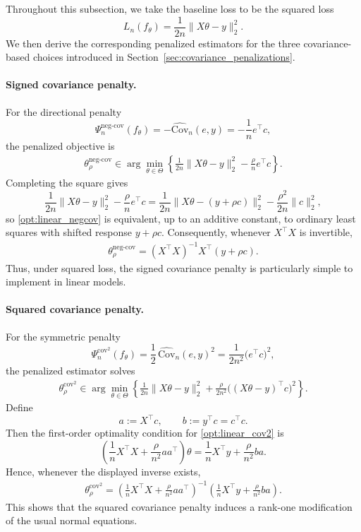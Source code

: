 \documentclass[12pt, draft]{article}
\theoremstyle{plain}
\theoremstyle{definition}
\newcommand{\1}{\mathbf{1}}
\newcommand{\Cov}{\text{Cov}}
\begin{document}
Throughout this subsection, we take the baseline loss to be the squared loss
\[
L_n(f_\theta) = \frac{1}{2n}\|X\theta-y\|_2^2.
\]
We then derive the corresponding penalized estimators for the three covariance-based choices introduced in Section~\ref{sec:covariance_penalizations}.

\paragraph{Signed covariance penalty.}
For the directional penalty
\[
\Psi_n^{\mathrm{neg\mbox{-}cov}}(f_\theta)
=
-\widehat{\Cov}_n(e,y)
=
-\frac{1}{n}e^\top c,
\]
the penalized objective is
\begin{align}
    \label{opt:linear_negcov}
    \theta_{\rho}^{\mathrm{neg\mbox{-}cov}}
    \in
    \arg\min_{\theta\in\Theta}
    \left\{
        \frac{1}{2n}\|X\theta-y\|_2^2
        -
        \frac{\rho}{n}e^\top c
    \right\}.
\end{align}
Completing the square gives
\[
\frac{1}{2n}\|X\theta-y\|_2^2
-
\frac{\rho}{n}e^\top c
=
\frac{1}{2n}\|X\theta-(y+\rho c)\|_2^2
-
\frac{\rho^2}{2n}\|c\|_2^2,
\]
so \eqref{opt:linear_negcov} is equivalent, up to an additive constant, to ordinary least squares with shifted response $y+\rho c$. Consequently, whenever $X^\top X$ is invertible,
\begin{align}
    \label{eq:linear_negcov_closed_form}
    \theta_{\rho}^{\mathrm{neg\mbox{-}cov}}
    =
    (X^\top X)^{-1}X^\top (y+\rho c).
\end{align}
Thus, under squared loss, the signed covariance penalty is particularly simple to implement in linear models.

\paragraph{Squared covariance penalty.}
For the symmetric penalty
\[
\Psi_n^{\mathrm{cov}^2}(f_\theta)
=
\frac{1}{2}\,\widehat{\Cov}_n(e,y)^2
=
\frac{1}{2n^2}\bigl(e^\top c\bigr)^2,
\]
the penalized estimator solves
\begin{align}
    \label{opt:linear_cov2}
    \theta_{\rho}^{\mathrm{cov}^2}
    \in
    \arg\min_{\theta\in\Theta}
    \left\{
        \frac{1}{2n}\|X\theta-y\|_2^2
        +
        \frac{\rho}{2n^2}\bigl((X\theta-y)^\top c\bigr)^2
    \right\}.
\end{align}
Define
\[
a := X^\top c,
\qquad
b := y^\top c = c^\top c.
\]
Then the first-order optimality condition for \eqref{opt:linear_cov2} is
\[
\left(
\frac{1}{n}X^\top X + \frac{\rho}{n^2}aa^\top
\right)\theta
=
\frac{1}{n}X^\top y + \frac{\rho}{n^2}ba.
\]
Hence, whenever the displayed inverse exists,
\begin{align}
    \label{eq:linear_cov2_closed_form}
    \theta_{\rho}^{\mathrm{cov}^2}
    =
    \left(
        \frac{1}{n}X^\top X
        +
        \frac{\rho}{n^2}aa^\top
    \right)^{-1}
    \left(
        \frac{1}{n}X^\top y
        +
        \frac{\rho}{n^2}ba
    \right).
\end{align}
This shows that the squared covariance penalty induces a rank-one modification of the usual normal equations.
\end{document}
